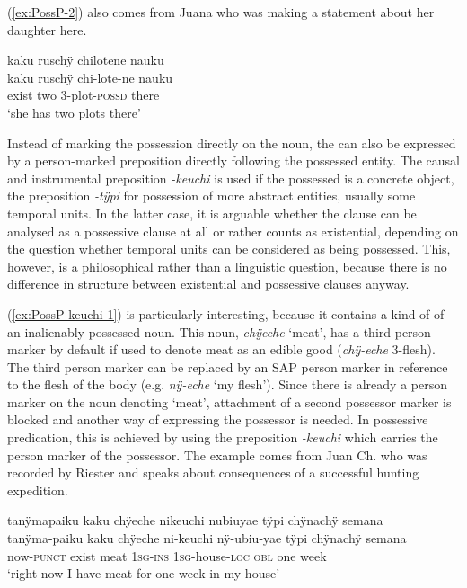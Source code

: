 (\ref{ex:PossP-2}) also comes from Juana who was making a statement about her daughter here.

\ea\label{ex:PossP-2}
\begingl 
\glpreamble kaku ruschÿ chilotene nauku\\
\gla kaku ruschÿ chi-lote-ne nauku\\ 
\glb exist two 3-plot-\textsc{possd} there\\ 
\glft ‘she has two plots there’\\ 
\endgl
\trailingcitation{[jxx-p110923l-1.421]}
\xe

Instead of marking the possession directly on the noun, the  can also be expressed by a person-marked preposition directly following the possessed entity. The causal and instrumental preposition \textit{-keuchi} is used if the possessed is a concrete object, the  preposition \textit{-tÿpi} for possession of more abstract entities, usually some temporal units. In the latter case, it is arguable whether the clause can be analysed as a possessive clause at all or rather counts as existential, depending on the question whether temporal units can be considered as being possessed. This, however, is a philosophical rather than a linguistic question, because there is no difference in structure between existential and possessive clauses anyway.

(\ref{ex:PossP-keuchi-1}) is particularly interesting, because it contains a kind of  of an inalienably possessed noun. This noun, \textit{chÿeche} ‘meat’, has a third person marker by default if used to denote meat as an edible good (\textit{chÿ-eche} 3-flesh). The third person marker can be replaced by an SAP person marker in reference to the flesh of the body (e.g. \textit{nÿ-eche} ‘my flesh’). Since there is already a person marker on the noun denoting ‘meat’, attachment of a second possessor marker is blocked and another way of expressing the possessor is needed. In possessive predication, this is achieved by using the preposition \textit{-keuchi} which carries the person marker of the possessor. The example comes from Juan Ch. who was recorded by Riester and speaks about consequences of a successful hunting expedition.

\ea\label{ex:PossP-keuchi-1}
\begingl 
\glpreamble tanÿmapaiku kaku chÿeche nikeuchi nubiuyae tÿpi chÿnachÿ semana\\
\gla tanÿma-paiku kaku chÿeche ni-keuchi nÿ-ubiu-yae tÿpi chÿnachÿ semana\\ 
\glb now-\textsc{punct} exist meat 1\textsc{sg}-\textsc{ins} 1\textsc{sg}-house-\textsc{loc} \textsc{obl} one week\\ 
\glft ‘right now I have meat for one week in my house’\\ 
\endgl
\trailingcitation{[nxx-a630101g-1.56]}
\xe

